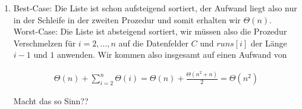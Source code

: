 \begin{solution}
\begin{enumerate}[label = (\alph*)]
    \item Best-Case: Die Liste ist schon aufsteigend sortiert, der Aufwand liegt also nur in der Schleife in der zweiten Prozedur und somit erhalten wir $\Theta(n)$. \\

    Worst-Case: Die Liste ist absteigend sortiert, wir müssen also die Prozedur Verschmelzen für $i = 2,\dots,n$ auf die Datenfelder $C$ und $runs[i]$ der Länge $i-1$ und $1$ anwenden. Wir kommen also insgesamt auf einen Aufwand von

    \begin{align*}
      \Theta(n) + \sum_{i=2}^{n} \Theta(i) = \Theta(n) + \frac{\Theta(n^2+n)}{2} = \Theta(n^2)
    \end{align*}

    Macht das so Sinn??

\end{enumerate}
\end{solution}



